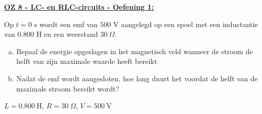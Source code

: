 \textbf{\underline{OZ 8 - LC- en  RLC-circuits - Oefening 1:}}
\vspace{0.5cm}

Op $t = 0$ s wordt een emf van $500$ V aangelegd op een spoel met een inductantie van
$0.800$ H en een weerstand $30 \ \Omega$.

\begin{enumerate}[(a)]
    \item Bepaal de energie opgeslagen in het magnetisch
    veld wanneer de stroom de helft van zijn maximale waarde heeft bereikt
    \item Nadat de emf wordt aangesloten, hoe lang duurt het voordat de helft van de maximale
    stroom bereikt wordt?
\end{enumerate}

\begin{description}[labelwidth=1.5cm, leftmargin=!]
    \item[Geg. :]  $L = 0.800 \ \text{H}$, $R = 30 \ \Omega$, $V = 500 \ \text{V}$
\end{description}

